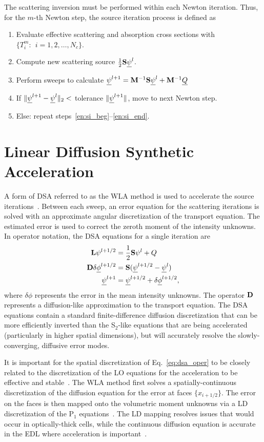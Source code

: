 The scattering inversion must be
performed within each Newton iteration.  Thus, for the $m$-th Newton step, the source
iteration process is defined as
\begin{enumerate}
    \item Evaluate effective scattering and absorption cross sections with
        ${\{T^m_i:\;\, i=1,2,\ldots,N_c\}}$.
    \item\label{en:si_beg} Compute new scattering source $\frac{1}{2}\mathbf{S} \underline{\psi}^l$.
    \item Perform sweeps to calculate $\underline{\psi}^{l+1} = \mathbf{M}^{-1} \mathbf{S}\underline{\psi}^{l} + \mathbf{M}^{-1} \underline{Q}$
    \item\label{en:si_end} If $\|\underline{\psi}^{l+1} - \underline{\psi}^{l} \|_2 < $ tolerance
        $\|\underline{\psi}^{l+1}\|$, move to next Newton step.
    \item Else: repeat steps~\ref{en:si_beg}--\ref{en:si_end}.
\end{enumerate}

\section{Linear Diffusion Synthetic Acceleration}

A form of DSA referred to as the WLA method is used to accelerate the source
iterations~\cite{wla,wla_thesis}. 
Between each sweep, an error equation for the scattering iterations is solved with an approximate angular
discretization of the transport equation.  The estimated error is used to correct the
zeroth moment of the intensity unknowns.  In operator notation, the DSA equations for a single
iteration are
\begin{align}
    \mathbf{L} \psi^{l+1/2} &= \frac{1}{2}\mathbf{S} \psi^{l} + Q \\
    \mathbf{D} \delta \underline{\phi}^{l+1/2} &= \mathbf{S} (\underline{\psi}^{l+1/2} - \underline{\psi}^{l}) \label{eq:dsa_oper} \\
     \underline{\psi}^{l+1} &= \underline{\psi}^{l+1/2} + \delta \underline{\phi}^{l+1/2},
\end{align}
where $\delta \phi$ represents the error in the mean intensity unknowns.
The operator $\mathbf{D}$ represents a diffusion-like approximation to the transport equation. The DSA equations contain a standard
finite-difference diffusion discretization that can be more efficiently
inverted than the S$_2$-like equations that are being accelerated (particularly in higher
spatial dimensions), but will accurately resolve the
slowly-converging, diffusive error modes. 

It is important for the spatial discretization of Eq.~\eqref{eq:dsa_oper} to be closely related to the discretization of the LO equations for the
acceleration to be effective and stable~\cite{adams_dsa}.  The WLA method first solves a spatially-continuous
discretization of the diffusion equation
for the error at faces $\{x_{i+1/2}\}$.  The error on the faces is then mapped onto the
volumetric moment unknowns via a LD discretization of the P$_1$ equations~\cite{wla}.
The LD mapping resolves issues that would occur in optically-thick cells, while the
continuous diffusion equation is accurate in the EDL where acceleration is important~\cite{adams_dsa}.



